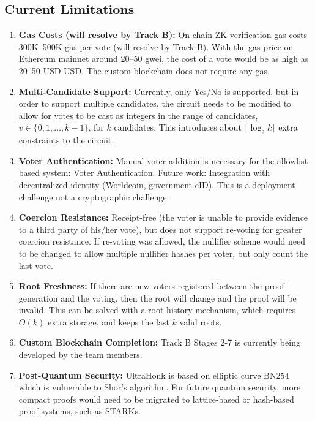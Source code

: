 \documentclass[12pt, a4paper]{report}
\begin{document}
\subsection{Current Limitations}

\begin{enumerate}
    \item \textbf{Gas Costs (will resolve by Track B):} On-chain ZK verification gas costs 300K--500K gas per vote (will resolve by Track B). With the gas price on Ethereum mainnet around 20--50 gwei, the cost of a vote would be as high as 20--50 USD USD. The custom blockchain does not require any gas.
    
    \item \textbf{Multi-Candidate Support:} Currently, only Yes/No is supported, but in order to support multiple candidates, the circuit needs to be modified to allow for votes to be cast as integers in the range of candidates, $v \in \{0, 1, \ldots, k-1\}$, for $k$ candidates. This introduces about $\lceil \log_2 k \rceil$ extra constraints to the circuit.
    
    \item \textbf{Voter Authentication:} Manual voter addition is necessary for the allowlist-based system: Voter Authentication. Future work: Integration with decentralized identity (Worldcoin, government eID). This is a deployment challenge not a cryptographic challenge.
    
    \item \textbf{Coercion Resistance:} Receipt-free (the voter is unable to provide evidence to a third party of his/her vote), but does not support re-voting for greater coercion resistance. If re-voting was allowed, the nullifier scheme would need to be changed to allow multiple nullifier hashes per voter, but only count the last vote.
    
    \item \textbf{Root Freshness:} If there are new voters registered between the proof generation and the voting, then the root will change and the proof will be invalid. This can be solved with a root history mechanism, which requires $O(k)$ extra storage, and keeps the last $k$ valid roots.
    
    \item \textbf{Custom Blockchain Completion:}  Track B Stages 2-7 is currently being developed by the team members.
    
    \item \textbf{Post-Quantum Security:} UltraHonk is based on elliptic curve BN254 which is vulnerable to Shor's algorithm. For future quantum security, more compact proofs would need to be migrated to lattice-based or hash-based proof systems, such as STARKs.
\end{enumerate}
\end{document}
